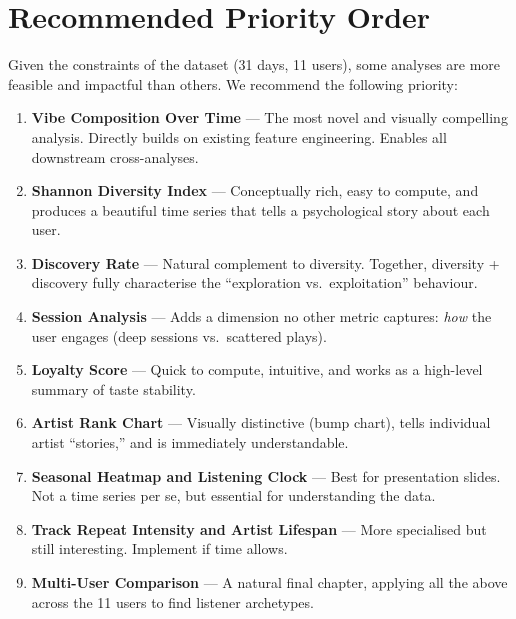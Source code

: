\documentclass[12pt, a4paper]{article}
\begin{document}
\section{Recommended Priority Order}

Given the constraints of the dataset (31 days, 11 users), some analyses are
more feasible and impactful than others. We recommend the following priority:

\begin{enumerate}[label=\textbf{\arabic*.}]
    \item \textbf{Vibe Composition Over Time} --- The most novel and visually
          compelling analysis. Directly builds on existing feature
          engineering. Enables all downstream cross-analyses.

    \item \textbf{Shannon Diversity Index} --- Conceptually rich, easy to
          compute, and produces a beautiful time series that tells a
          psychological story about each user.

    \item \textbf{Discovery Rate} --- Natural complement to diversity.
          Together, diversity + discovery fully characterise the
          ``exploration vs.\ exploitation'' behaviour.

    \item \textbf{Session Analysis} --- Adds a dimension no other metric
          captures: \emph{how} the user engages (deep sessions vs.\
          scattered plays).

    \item \textbf{Loyalty Score} --- Quick to compute, intuitive, and
          works as a high-level summary of taste stability.

    \item \textbf{Artist Rank Chart} --- Visually distinctive (bump chart),
          tells individual artist ``stories,'' and is immediately
          understandable.

    \item \textbf{Seasonal Heatmap and Listening Clock} --- Best for
          presentation slides. Not a time series per se, but essential for
          understanding the data.

    \item \textbf{Track Repeat Intensity and Artist Lifespan} --- More
          specialised but still interesting. Implement if time allows.

    \item \textbf{Multi-User Comparison} --- A natural final chapter,
          applying all the above across the 11 users to find listener
          archetypes.
\end{enumerate}
\end{document}
